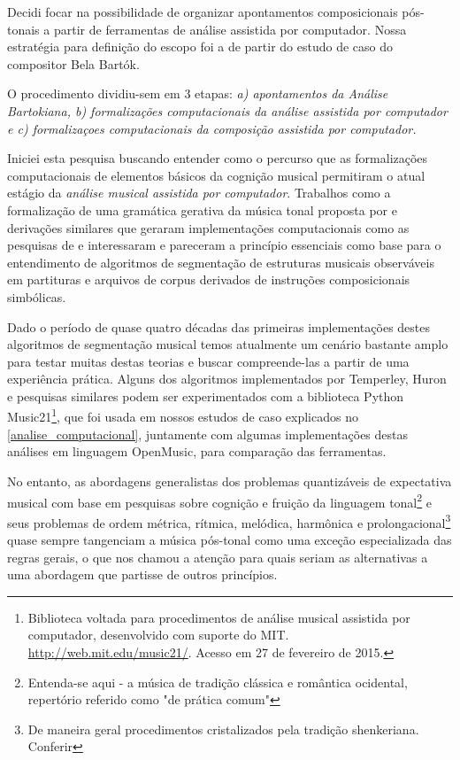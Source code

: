 \documentclass[
	12pt,				%
	openright,			%
	twoside,			%
	a4paper,			%
	english,			%
	french,				%
	spanish,			%
	brazil				%
	]{abntex2}
\begin{document}
Decidi focar na possibilidade de organizar apontamentos composicionais pós-tonais a partir de ferramentas de análise assistida por computador. Nossa estratégia para definição do escopo foi a de partir do estudo de caso do compositor Bela Bartók.

O procedimento dividiu-sem em 3 etapas:\textit{ a) apontamentos da Análise Bartokiana, b) formalizações computacionais da análise assistida por computador e c) formalizaçoes computacionais da composição assistida por computador.}



Iniciei esta pesquisa buscando entender como o percurso que as formalizações computacionais de elementos básicos da cognição musical permitiram o atual estágio da \textit{análise musical assistida por computador}. Trabalhos como a formalização de uma gramática gerativa da música tonal proposta por  e derivações similares que geraram implementações computacionais como as pesquisas de  e  interessaram e pareceram a princípio essenciais como base para o entendimento de algoritmos de segmentação de estruturas musicais observáveis em partituras e arquivos de corpus derivados de instruções composicionais simbólicas.

Dado o período de quase quatro décadas das primeiras implementações destes algoritmos de segmentação musical temos atualmente um cenário bastante amplo para testar muitas destas teorias e buscar compreende-las a partir de uma experiência prática. Alguns dos algoritmos implementados por Temperley, Huron e pesquisas similares podem ser experimentados com a biblioteca Python Music21\footnote{Biblioteca voltada para procedimentos de análise musical assistida por computador, desenvolvido com suporte do MIT. \url{http://web.mit.edu/music21/}. Acesso em 27 de fevereiro de 2015.}, que foi usada em nossos estudos de caso explicados no \autoref{analise_computacional}, juntamente com algumas implementações destas análises em linguagem OpenMusic, para comparação das ferramentas.

No entanto, as abordagens generalistas dos problemas quantizáveis de expectativa musical com base em pesquisas sobre cognição e fruição da linguagem tonal\footnote{ Entenda-se aqui - a música de tradição clássica e romântica ocidental, repertório referido como "de prática comum"\cite{temperley2001cognition} } e seus problemas de ordem métrica, rítmica, melódica, harmônica e prolongacional\footnote{De maneira geral procedimentos cristalizados pela tradição shenkeriana. Conferir  } quase sempre tangenciam a música pós-tonal como uma exceção especializada das regras gerais, o que nos chamou a atenção para quais seriam as alternativas a uma abordagem que partisse de outros princípios. 
\end{document}
